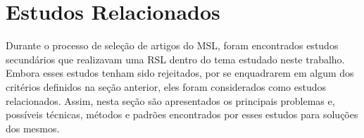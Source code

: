 \section{Estudos Relacionados}

Durante o processo de seleção de artigos do MSL, foram encontrados estudos secundários que realizavam uma RSL dentro do tema estudado neste trabalho.
Embora esses estudos tenham sido rejeitados, por se enquadrarem em algum dos critérios definidos na seção anterior, eles foram considerados como estudos relacionados.
Assim, nesta seção são apresentados os principais problemas e, possíveis técnicas, métodos e padrões encontrados por esses estudos para soluções dos mesmos.